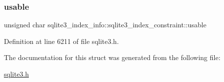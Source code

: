 \subsubsection{\texorpdfstring{usable}{usable}}
{\footnotesize\ttfamily unsigned char sqlite3\+\_\+index\+\_\+info\+::sqlite3\+\_\+index\+\_\+constraint\+::usable}



Definition at line 6211 of file sqlite3.\+h.



The documentation for this struct was generated from the following file\+:\begin{DoxyCompactItemize}
\item 
\mbox{\hyperlink{sqlite3_8h}{sqlite3.\+h}}\end{DoxyCompactItemize}
